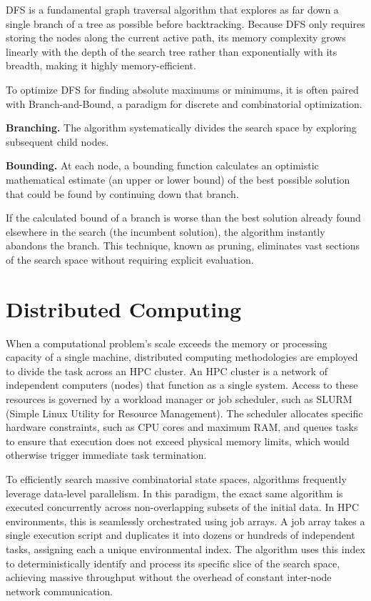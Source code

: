 DFS is a fundamental graph traversal algorithm that explores as far down a single branch of a tree as possible before backtracking. Because DFS only requires storing the nodes along the current active path, its memory complexity grows linearly with the depth of the search tree rather than exponentially with its breadth, making it highly memory-efficient.

To optimize DFS for finding absolute maximums or minimums, it is often paired with Branch-and-Bound, a paradigm for discrete and combinatorial optimization.

\medskip

\textbf{Branching.}
The algorithm systematically divides the search space by exploring subsequent child nodes.

\textbf{Bounding.}
At each node, a bounding function calculates an optimistic mathematical estimate (an upper or lower bound) of the best possible solution that could be found by continuing down that branch.

\medskip

If the calculated bound of a branch is worse than the best solution already found elsewhere in the search (the incumbent solution), the algorithm instantly abandons the branch. This technique, known as pruning, eliminates vast sections of the search space without requiring explicit evaluation.

\section{Distributed Computing}
\label{sec:distributed_computing}

When a computational problem's scale exceeds the memory or processing capacity of a single machine, distributed computing methodologies are employed to divide the task across an HPC cluster. An HPC cluster is a network of independent computers (nodes) that function as a single system. Access to these resources is governed by a workload manager or job scheduler, such as SLURM (Simple Linux Utility for Resource Management). The scheduler allocates specific hardware constraints, such as CPU cores and maximum RAM, and queues tasks to ensure that execution does not exceed physical memory limits, which would otherwise trigger immediate task termination.

\medskip

To efficiently search massive combinatorial state spaces, algorithms frequently leverage data-level parallelism. In this paradigm, the exact same algorithm is executed concurrently across non-overlapping subsets of the initial data. In HPC environments, this is seamlessly orchestrated using job arrays. A job array takes a single execution script and duplicates it into dozens or hundreds of independent tasks, assigning each a unique environmental index. The algorithm uses this index to deterministically identify and process its specific slice of the search space, achieving massive throughput without the overhead of constant inter-node network communication.

